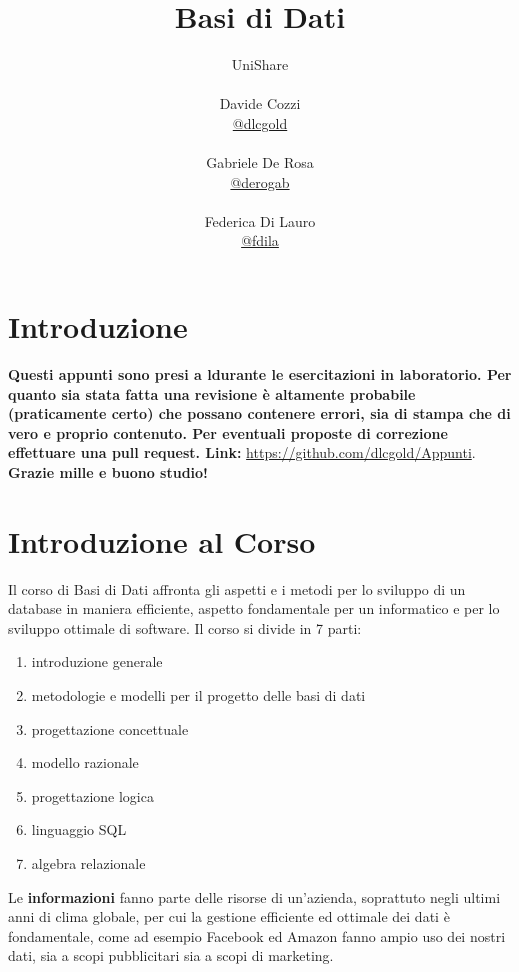 \documentclass[a4paper,12pt, oneside]{book}
\title{Basi di Dati}
\author{UniShare\\\\Davide Cozzi\\\href{https://t.me/dlcgold}{@dlcgold}\\\\Gabriele De Rosa\\\href{https://t.me/derogab}{@derogab} \\\\Federica Di Lauro\\\href{https://t.me/f_dila}{@f\textunderscore dila}}
\date{}
\begin{document}
\maketitle

\newtheorem{teorema}{Teorema}
\newtheorem{definizione}{Definizione}
\newtheorem{esempio}{Esempio}
\newtheorem{corollario}{Corollario}
\newtheorem{lemma}{Lemma}
\newtheorem{osservazione}{Osservazione}
\newtheorem{nota}{Nota}
\newtheorem{esercizio}{Esercizio}
\tableofcontents
\renewcommand{\chaptermark}[1]{%
\markboth{\chaptername
\ \thechapter.\ #1}{}}
\renewcommand{\sectionmark}[1]{\markright{\thesection.\ #1}}
\chapter{Introduzione}
\textbf{Questi appunti sono presi a ldurante le esercitazioni in laboratorio. Per quanto sia stata fatta una revisione è altamente probabile (praticamente certo) che possano contenere errori, sia di stampa che di vero e proprio contenuto. Per eventuali proposte di correzione effettuare una pull request. Link: } \url{https://github.com/dlcgold/Appunti}.\\
\textbf{Grazie mille e buono studio!}
\chapter{Introduzione al Corso}
Il corso di Basi di Dati affronta gli aspetti e i metodi per lo sviluppo di un database in maniera efficiente,
aspetto fondamentale per un informatico e per lo sviluppo ottimale di software. \newline
Il corso si divide in 7 parti:
\begin{enumerate}
\item introduzione generale
\item metodologie e modelli per il progetto delle basi di dati
\item progettazione concettuale
\item modello razionale
\item progettazione logica
\item linguaggio SQL
\item algebra relazionale
\end{enumerate}
Le \textbf{informazioni} fanno parte delle risorse di un'azienda, soprattuto negli ultimi anni di clima globale,
per cui la gestione efficiente ed ottimale dei dati è fondamentale, come ad esempio Facebook ed Amazon fanno ampio
uso dei nostri dati, sia a scopi pubblicitari sia a scopi di marketing.
\end{document}
